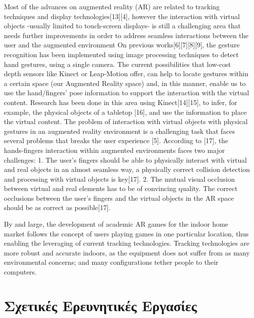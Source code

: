 Most of the advances on augmented reality (AR) are related to tracking techniques and display technologies[13][4], however the interaction with virtual objects -usually limited to touch-screen displays- is still a challenging area that needs further improvements in order to address seamless interactions between the user and the augmented environment On previous works[6][7][8][9], the gesture recognition has been implemented using image processing techniques to detect hand gestures, using a single camera. The current possibilities that low-cost depth sensors like Kinect or Leap-Motion offer, can help to locate gestures within a certain space (our Augmented Reality space) and, in this manner, enable us to use the hand/fingers’ pose information to support the interaction with the virtual content. Research has been done in this area using Kinect[14][15], to infer, for example, the physical objects of a tabletop [16], and use the information to place the virtual content. The problem of interaction with virtual objects with physical gestures in an augmented reality environment is a challenging task that faces several problems that breaks the user experience [5]. According to [17], the hands-fingers interaction within augmented environments faces two major challenges: 1. The user’s fingers should be able to physically interact with virtual and real objects in an almost seamless way, a physically correct collision detection and processing with virtual objects is key[17]. 2. The mutual visual occlusion between virtual and real elements has to be of convincing quality. The correct occlusions between the user’s fingers and the virtual objects in the AR space should be as correct as possible[17].



By and large, the development of academic AR games for the indoor home market follows the concept of users playing games in one particular location, thus enabling the leveraging of current tracking technologies. Tracking technologies are more robust and accurate indoors, as the equipment does not suffer from as many environmental concerns; and many configurations tether people to their computers.

\section{Σχετικές Ερευνητικές Εργασίες}

